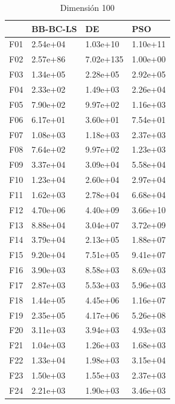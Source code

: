 \begin{table}[H]
\begin{minipage}{.5\linewidth}
    \end{minipage}%
    \begin{minipage}{.5\linewidth}
      \centering
      \caption{Dimensión 100}
      \begin{tabular}{llll}
        \toprule
        {} &  BB-BC-LS &         DE &       PSO \\
        \midrule
        F01  &  2.54e+04 &   1.03e+10 &  1.10e+11 \\
        F02  &  2.57e+86 &  7.02e+135 &  1.00e+00 \\
        F03  &  1.34e+05 &   2.28e+05 &  2.92e+05 \\
        F04  &  2.33e+02 &   1.49e+03 &  2.26e+04 \\
        F05  &  7.90e+02 &   9.97e+02 &  1.16e+03 \\
        F06  &  6.17e+01 &   3.60e+01 &  7.54e+01 \\
        F07  &  1.08e+03 &   1.18e+03 &  2.37e+03 \\
        F08  &  7.64e+02 &   9.97e+02 &  1.23e+03 \\
        F09  &  3.37e+04 &   3.09e+04 &  5.58e+04 \\
        F10  &  1.23e+04 &   2.60e+04 &  2.97e+04 \\
        F11  &  1.62e+03 &   2.78e+04 &  6.68e+04 \\
        F12  &  4.70e+06 &   4.40e+09 &  3.66e+10 \\
        F13  &  8.88e+04 &   3.04e+07 &  3.72e+09 \\
        F14  &  3.79e+04 &   2.13e+05 &  1.88e+07 \\
        F15  &  9.20e+04 &   7.51e+05 &  9.41e+07 \\
        F16  &  3.90e+03 &   8.58e+03 &  8.69e+03 \\
        F17  &  2.87e+03 &   5.53e+03 &  5.96e+03 \\
        F18  &  1.44e+05 &   4.45e+06 &  1.16e+07 \\
        F19  &  2.35e+05 &   4.17e+06 &  5.26e+08 \\
        F20  &  3.11e+03 &   3.94e+03 &  4.93e+03 \\
        F21  &  1.04e+03 &   1.26e+03 &  1.68e+03 \\
        F22  &  1.33e+04 &   1.98e+03 &  3.15e+04 \\
        F23  &  1.50e+03 &   1.55e+03 &  2.37e+03 \\
        F24  &  2.21e+03 &   1.90e+03 &  3.46e+03 \\

\end{tabular}
\end{minipage}
\end{table}
